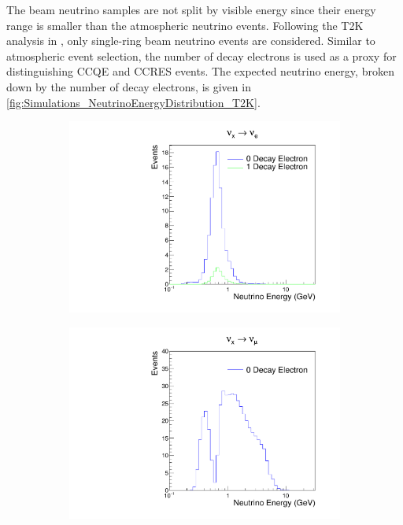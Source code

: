 The beam neutrino samples are not split by visible energy since their energy range is smaller than the atmospheric neutrino events. Following the T2K analysis in \cite{Dunne2020-uf}, only single-ring beam neutrino events are considered. Similar to atmospheric event selection, the number of decay electrons is used as a proxy for distinguishing CCQE and CCRES events. The expected neutrino energy, broken down by the number of decay electrons, is given in \autoref{fig:Simulations_NeutrinoEnergyDistribution_T2K}.

\begin{figure}[h]
  \begin{subfigure}[t]{0.49\textwidth}
    \includegraphics[width=\textwidth, trim={0mm 0mm 0mm 0mm}, clip,page=1]{Figures/Simulations/NeutrinoEnergyDist_T2K_NuE.pdf}
  \end{subfigure}%
  \begin{subfigure}[t]{0.49\textwidth}
    \includegraphics[width=\textwidth, trim={0mm 0mm 0mm 0mm}, clip,page=1]{Figures/Simulations/NeutrinoEnergyDist_T2K_NuMu.pdf}

\end{subfigure}
\end{figure}

